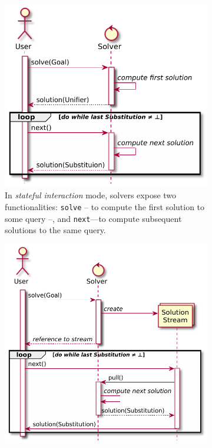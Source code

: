 \documentclass[12pt,a4paper,openright,twoside]{book}
\begin{document}
\begin{figure}
    \centering
    \caption{Interaction modes between logic solvers and users or KB.}
    \label{fig:user-solver-interaction}
    \begin{subfigure}{0.48\linewidth}\centering
        \includegraphics[width=\linewidth]{figures/stateful-solver.pdf}
        \caption{In \emph{stateful interaction} mode, solvers expose two functionalities: \texttt{solve} -- to compute the first solution to some query --, and \texttt{next}---to compute subsequent solutions to the same query.}
        \label{fig:user-solver-interaction:stateful}
    \end{subfigure}
    \hfill
    \begin{subfigure}{0.48\linewidth}\centering
        \includegraphics[width=\linewidth]{figures/streamful-solver.pdf}

\end{subfigure}
\end{figure}
\end{document}
